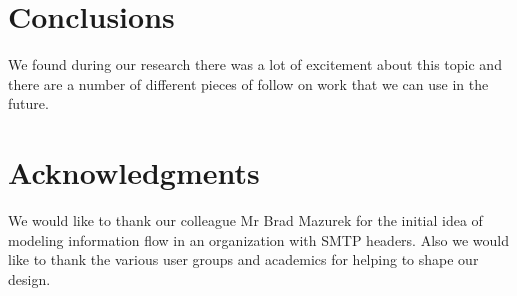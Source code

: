 \documentclass[journal]{vgtc}                %
\begin{document}
\section{Conclusions}

We found during our research there was a lot of excitement about this topic and there are a number of different pieces of follow on work that we can use in the future.

\section{Acknowledgments}
We would like to thank our colleague Mr Brad Mazurek for the initial idea of modeling information flow in an organization with SMTP headers.  Also we would like to thank the various user groups and academics for helping to shape our design.



\end{document}
